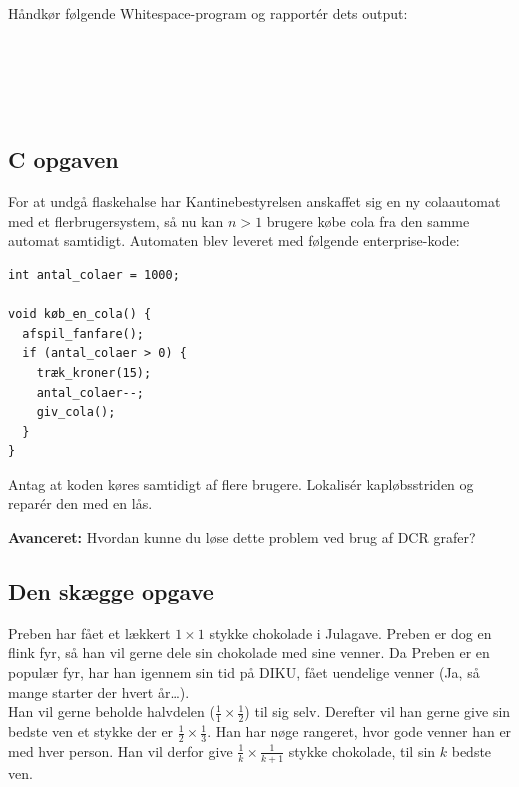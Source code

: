 Håndkør følgende Whitespace-program og rapportér dets output:
\begin{verbatim}





\end{verbatim}

\newpage
\subsection{C opgaven}
For at undgå flaskehalse har Kantinebestyrelsen anskaffet sig en ny colaautomat
med et flerbrugersystem, så nu kan $n > 1$ brugere købe cola fra den samme
automat samtidigt.  Automaten blev leveret med følgende enterprise-kode:
\begin{verbatim}
int antal_colaer = 1000;

void køb_en_cola() {
  afspil_fanfare();
  if (antal_colaer > 0) {
    træk_kroner(15);
    antal_colaer--;
    giv_cola();
  }
}
\end{verbatim}
Antag at koden køres samtidigt af flere brugere.  Lokalisér kapløbsstriden og
reparér den med en lås.

\textbf{Avanceret:} Hvordan kunne du løse dette problem ved brug af DCR grafer?

\newpage

\subsection{Den skægge opgave}

Preben har fået et lækkert $1 \times 1$ stykke chokolade i Julagave. Preben er
dog en flink fyr, så han vil gerne dele sin chokolade med sine venner.
Da Preben er en populær fyr, har han igennem sin tid på DIKU, fået uendelige
venner (Ja, så mange starter der hvert år\ldots).\\
\noindent Han vil gerne beholde halvdelen ($\frac{1}{1} \times \frac{1}{2}$) til
sig selv.
Derefter vil han gerne give sin bedste ven et stykke der er $\frac{1}{2} \times
\frac{1}{3}$. Han har nøge rangeret, hvor gode venner han er med hver person.
Han vil derfor give $\frac{1}{k} \times \frac{1}{k + 1}$ stykke chokolade, til
sin $k$ bedste ven.\\


